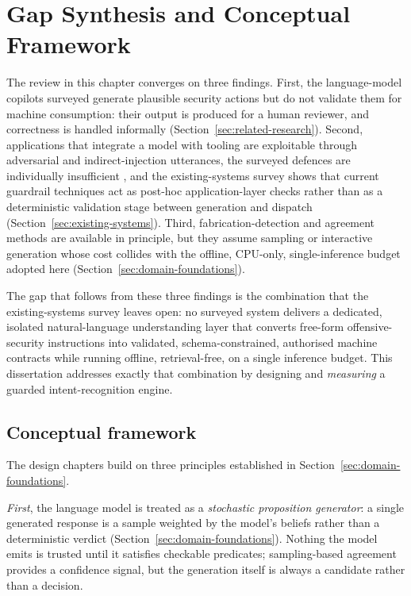 \section{Gap Synthesis and Conceptual Framework}\label{sec:gap-synthesis}

The review in this chapter converges on three findings. First, the
language-model copilots surveyed \parencite{deng2024pentestgpt,happe2023pwned}
generate plausible security actions but do not validate them for machine
consumption: their output is produced for a human reviewer, and correctness is
handled informally (Section~\ref{sec:related-research}). Second, applications
that integrate a model with tooling are exploitable through adversarial and
indirect-injection utterances, the surveyed defences are individually
insufficient \parencite{liu2023promptinjection,greshake2023indirect}, and the
existing-systems survey shows that current guardrail techniques act as
post-hoc application-layer checks rather than as a deterministic validation
stage between generation and dispatch (Section~\ref{sec:existing-systems}).
Third, fabrication-detection and agreement methods
\parencite{manakul2023selfcheckgpt,kuhn2023semantic,farquhar2024semantic,wang2023selfconsistency}
are available in principle, but they assume sampling or interactive generation
whose cost collides with the offline, CPU-only, single-inference budget adopted
here (Section~\ref{sec:domain-foundations}).

The gap that follows from these three findings is the combination that the
existing-systems survey leaves open: no surveyed system delivers a dedicated,
isolated natural-language understanding layer that converts free-form
offensive-security instructions into validated, schema-constrained, authorised
machine contracts while running offline, retrieval-free, on a single inference
budget. This dissertation addresses exactly that combination by designing and
\emph{measuring} a guarded intent-recognition engine.

\subsection*{Conceptual framework}

The design chapters build on three principles established in
Section~\ref{sec:domain-foundations}.

\emph{First}, the language model is treated as a \emph{stochastic proposition
generator}: a single generated response is a sample weighted by the model's
beliefs rather than a deterministic verdict
(Section~\ref{sec:domain-foundations}). Nothing the model emits is trusted until
it satisfies checkable predicates; sampling-based agreement
\parencite{wang2023selfconsistency} provides a confidence signal, but the
generation itself is always a candidate rather than a decision.

